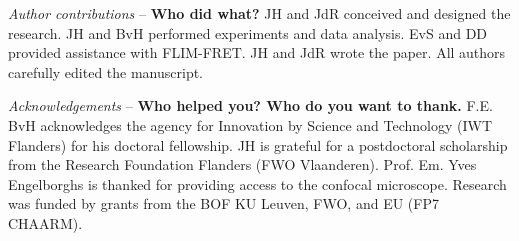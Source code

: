 \textit{Author contributions} -- \textbf{Who did what?} 
JH and JdR conceived and designed the research. 
JH and BvH performed experiments and data analysis. 
EvS and DD provided assistance with FLIM-FRET. JH and JdR wrote the paper. 
All authors carefully edited the manuscript.

\textit{Acknowledgements} -- \textbf{Who helped you? Who do you want to thank.} 
F.E. BvH acknowledges the agency for Innovation by Science and Technology (IWT Flanders) for his doctoral fellowship. 
JH is grateful for a postdoctoral scholarship from the Research Foundation Flanders (FWO Vlaanderen). 
Prof. Em. Yves Engelborghs is thanked for providing access to the confocal microscope. 
Research was funded by grants from the BOF KU Leuven, FWO, and EU (FP7 CHAARM).
